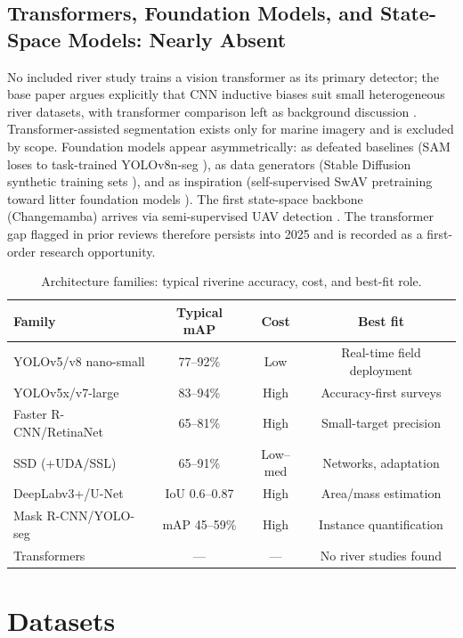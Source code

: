 \documentclass[12pt]{article}
\begin{document}
\subsection{Transformers, Foundation Models, and State-Space Models: Nearly Absent}
No included river study trains a vision transformer as its primary detector; the base paper argues explicitly that CNN inductive biases suit small heterogeneous river datasets, with transformer comparison left as background discussion \cite{Pati2025}. Transformer-assisted segmentation exists only for marine imagery and is excluded by scope. Foundation models appear asymmetrically: as defeated baselines (SAM loses to task-trained YOLOv8n-seg \cite{Pan2024}), as data generators (Stable Diffusion synthetic training sets \cite{Pan2023}), and as inspiration (self-supervised SwAV pretraining toward litter foundation models \cite{JiaSwAV2024}). The first state-space backbone (Changemamba) arrives via semi-supervised UAV detection \cite{Sun2025}. The transformer gap flagged in prior reviews therefore persists into 2025 and is recorded as a first-order research opportunity.

\begin{table}[!t]
\centering
\caption{Architecture families: typical riverine accuracy, cost, and best-fit role.}
\label{tab:archs}
\begin{tabular}{lccc}
\hline
\textbf{Family} & \textbf{Typical mAP} & \textbf{Cost} & \textbf{Best fit} \\
\hline
YOLOv5/v8 nano-small & 77--92\% & Low & Real-time field deployment \\
YOLOv5x/v7-large & 83--94\% & High & Accuracy-first surveys \\
Faster R-CNN/RetinaNet & 65--81\% & High & Small-target precision \\
SSD (+UDA/SSL) & 65--91\% & Low--med & Networks, adaptation \\
DeepLabv3+/U-Net & IoU 0.6--0.87 & High & Area/mass estimation \\
Mask R-CNN/YOLO-seg & mAP 45--59\% & High & Instance quantification \\
Transformers & --- & --- & No river studies found \\
\hline
\end{tabular}
\end{table}

\section{Datasets}
\label{sec:datasets}
\end{document}
